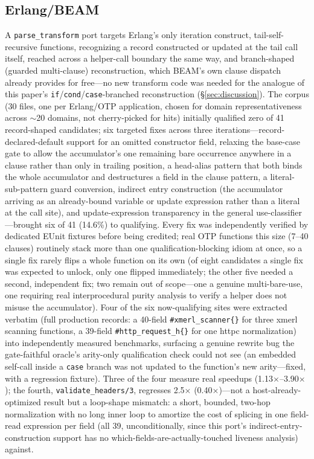 \documentclass[sigplan,screen,review,anonymous]{acmart}
\begin{document}
\subsection{Erlang/BEAM}

A \texttt{parse\_transform} port targets Erlang's only iteration
construct, tail-self-recursive functions, recognizing a record
constructed or updated at the tail call itself, reached across a
helper-call boundary the same way, and branch-shaped (guarded
multi-clause) reconstruction, which BEAM's own clause dispatch already
provides for free---no new transform code was needed for the analogue
of this paper's \texttt{if}/\texttt{cond}/\texttt{case}-branched
reconstruction (\S\ref{sec:discussion}). The corpus (30 files, one per
Erlang/OTP application, chosen for domain representativeness across
$\sim$20 domains, not cherry-picked for hits) initially qualified zero
of 41 record-shaped candidates; six targeted fixes across three
iterations---record-declared-default support for an omitted
constructor field, relaxing the base-case gate to allow the
accumulator's one remaining bare occurrence anywhere in a clause rather
than only in trailing position, a head-alias pattern that both binds
the whole accumulator and destructures a field in the clause pattern,
a literal-sub-pattern guard conversion, indirect entry construction
(the accumulator arriving as an already-bound variable or update
expression rather than a literal at the call site), and update-expression
transparency in the general use-classifier---brought six of 41 (14.6\%)
to qualifying. Every fix was independently verified by dedicated EUnit
fixtures before being credited; real OTP functions this size (7--40
clauses) routinely stack more than one qualification-blocking idiom at
once, so a single fix rarely flips a whole function on its own (of
eight candidates a single fix was expected to unlock, only one flipped
immediately; the other five needed a second, independent fix; two
remain out of scope---one a genuine multi-bare-use, one requiring real
interprocedural purity analysis to verify a helper does not misuse the
accumulator). Four of the six now-qualifying sites were extracted
verbatim (full production records: a 40-field \texttt{\#xmerl\_scanner\{\}}
for three xmerl scanning functions, a 39-field \texttt{\#http\_request\_h\{\}}
for one httpc normalization) into independently measured benchmarks,
surfacing a genuine rewrite bug the gate-faithful oracle's arity-only
qualification check could not see (an embedded self-call inside a
\texttt{case} branch was not updated to the function's new arity---fixed,
with a regression fixture). Three of the four measure real speedups
(1.13$\times$--3.90$\times$); the fourth, \texttt{validate\_headers/3},
regresses 2.5$\times$ (0.40$\times$)---not a host-already-optimized
result but a loop-shape mismatch: a short, bounded, two-hop
normalization with no long inner loop to amortize the cost of splicing
in one field-read expression per field (all 39, unconditionally, since
this port's indirect-entry-construction support has no
which-fields-are-actually-touched liveness analysis) against.
\end{document}
